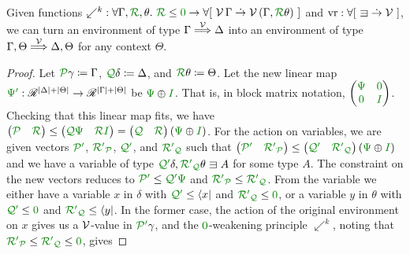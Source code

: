 \begin{lemma}\label{thm:lr-bind}
  Given functions
  ${\swarrow^k} : \forall \Gamma, \grR, \theta.~\grR \leq \gr0 \to
  \forallb{\V\,\Gamma \dotto \V\,\plr{\Gamma, \grR\theta}}$ and
  $\mathrm{vr} : \forallb{{\sqni} \dotto \V}$, we can turn an environment of
  type $\Gamma \stackrel{\mathcal V}\Longrightarrow \Delta$ into an environment of type
  $\Gamma, \Theta \stackrel{\mathcal V}\Longrightarrow \Delta, \Theta$ for any context $\Theta$.
\end{lemma}
\begin{proof}
  Let $\grP\gamma \coloneqq \Gamma$, $\grQ\delta \coloneqq \Delta$, and
  $\grR\theta \coloneqq \Theta$.
  Let the new linear map $\gr\Psi\gr' : \Ann^{\size\Delta + \size\Theta} \to
  \Ann^{\size\Gamma + \size\Theta}$ be $\gr\Psi \oplus \gr I$.
  That is, in block matrix notation,
  $\begin{pmatrix} \gr\Psi & \gr0 \\ \gr0 & \gr I \end{pmatrix}$.
  Checking that this linear map fits, we have
  $\begin{pmatrix}\grP & \grR\end{pmatrix}
  \leq \begin{pmatrix}\grQ\gr\Psi & \grR\gr I\end{pmatrix}
  = \begin{pmatrix}\grQ & \grR\end{pmatrix}\plr{\gr\Psi \oplus \gr I}$.
  For the action on variables, we are given vectors $\grPprime$,
  $\grR\gr'_\grP$, $\grQprime$, and $\grR\gr'_\grQ$ such that
  $\begin{pmatrix} \grPprime & \grR\gr'_\grP \end{pmatrix} \leq
  \begin{pmatrix} \grQprime & \grR\gr'_\grQ \end{pmatrix}
  \plr{\gr\Psi \oplus \gr I}$ and we have a variable of type
  $\grQprime\delta, \grR\gr'_\grQ\theta \sqni A$ for some type $A$.
  The constraint on the new vectors reduces to $\grPprime \leq \grQprime\gr\Psi$
  and $\grR\gr'_\grP \leq \grR\gr'_\grQ$.
  From the variable we either have a variable $x$ in $\delta$ with
  $\grQprime \leq \langle x \rvert$ and $\grR\gr'_\grQ \leq \gr0$, or a
  variable $y$ in $\theta$ with $\grQprime \leq \gr0$ and
  $\grR\gr'_\grQ \leq \langle y \rvert$.
  In the former case, the action of the original environment on $x$ gives us a
  $\mathcal V$-value in $\grPprime\gamma$, and the $\gr0$-weakening principle
  $\swarrow^k$, noting that $\grR\gr'_\grP \leq \grR\gr'_\grQ \leq \gr0$, gives

\end{proof}
